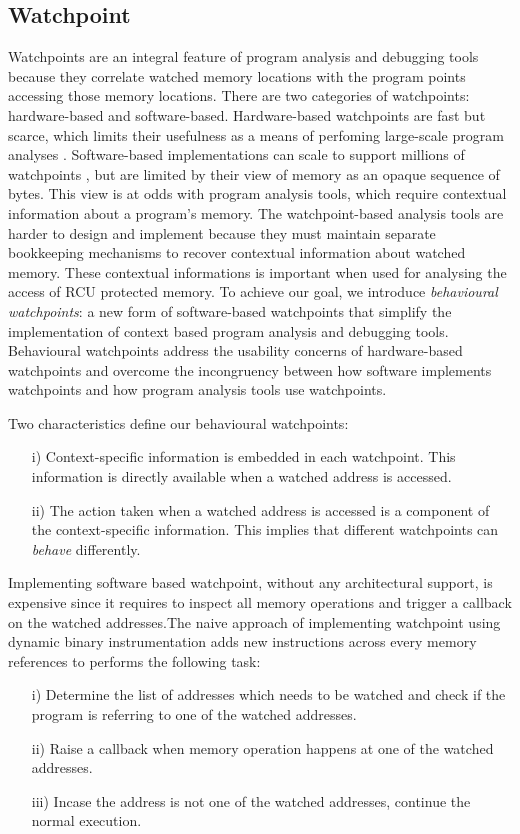 \subsection{Watchpoint}
Watchpoints are an integral feature of program analysis and debugging tools because they correlate watched memory locations with the program points accessing those memory locations. There are two categories of watchpoints: hardware-based and software-based. Hardware-based watchpoints are fast but scarce, which limits their usefulness as a means of perfoming large-scale program analyses \cite{UnlimitedWatchpoints}. Software-based implementations can scale to support millions of watchpoints \cite{Zhao:2008}, but are limited by their view of memory as an opaque sequence of bytes. This view is at odds with program analysis tools, which require contextual information about a program's memory. The watchpoint-based analysis tools are harder to design and implement because they must maintain separate bookkeeping mechanisms to recover contextual information about watched memory. These contextual informations is important when used for analysing the access of RCU protected memory. To achieve our goal, we introduce \emph{behavioural watchpoints}: a new form of software-based watchpoints that simplify the implementation of context based program analysis and debugging tools.  Behavioural watchpoints address the usability concerns of hardware-based watchpoints and overcome the incongruency between how software implements watchpoints and how program analysis tools use watchpoints.

Two characteristics define our behavioural watchpoints:
\begin{enumerate}
	\item[i)] Context-specific information is embedded in each watchpoint. This information is directly available when a watched address is accessed.
	\item[ii)] The action taken when a watched address is accessed is a component of the context-specific information. This implies that different watchpoints can \emph{behave} differently.
\end{enumerate} 

Implementing software based watchpoint, without any architectural support, is expensive since it requires to inspect all memory operations and trigger a callback on the watched addresses.The naive approach of implementing watchpoint using dynamic binary instrumentation adds new instructions across every memory references to performs the following task: 
\begin{enumerate}
	\item[i)] Determine the list of addresses which needs to be watched and check if the program is referring to one of the watched addresses.  
	\item[ii)] Raise a callback when memory operation happens at one of the watched addresses.
	\item[iii)] Incase the address is not one of the watched addresses, continue the normal execution.
\end{enumerate} 
 
